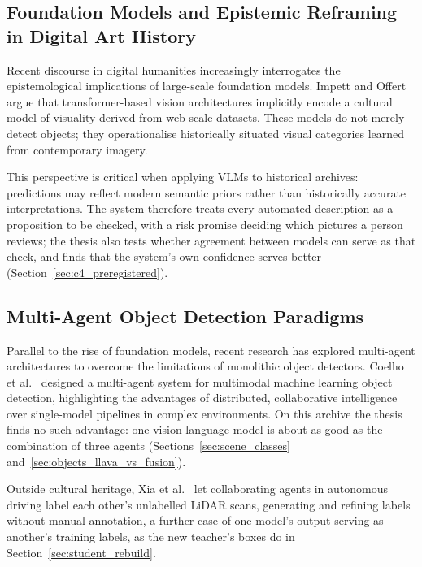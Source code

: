 \documentclass[12pt,a4paper]{report}
\begin{document}
\subsection{Foundation Models and Epistemic Reframing in Digital Art History}
Recent discourse in digital humanities increasingly interrogates the epistemological implications of large-scale foundation models. Impett and Offert~\cite{impett_offert_2022_dah} argue that transformer-based vision architectures implicitly encode a cultural model of visuality derived from web-scale datasets. These models do not merely detect objects; they operationalise historically situated visual categories learned from contemporary imagery.

This perspective is critical when applying VLMs to historical archives: predictions may reflect modern semantic priors rather than historically accurate interpretations. The system therefore treats every automated description as a proposition to be checked, with a risk promise deciding which pictures a person reviews; the thesis also tests whether agreement between models can serve as that check, and finds that the system's own confidence serves better (Section~\ref{sec:c4_preregistered}).



\subsection{Multi-Agent Object Detection Paradigms}
Parallel to the rise of foundation models, recent research has explored multi-agent architectures to overcome the limitations of monolithic object detectors. Coelho et al.~\cite{coelho2023multiagent} designed a multi-agent system for multimodal machine learning object detection, highlighting the advantages of distributed, collaborative intelligence over single-model pipelines in complex environments. On this archive the thesis finds no such advantage: one vision-language model is about as good as the combination of three agents (Sections~\ref{sec:scene_classes} and~\ref{sec:objects_llava_vs_fusion}).

Outside cultural heritage, Xia et al.~\cite{xia2025dota} let collaborating agents in autonomous driving label each other's unlabelled LiDAR scans, generating and refining labels without manual annotation, a further case of one model's output serving as another's training labels, as the new teacher's boxes do in Section~\ref{sec:student_rebuild}.
\end{document}
